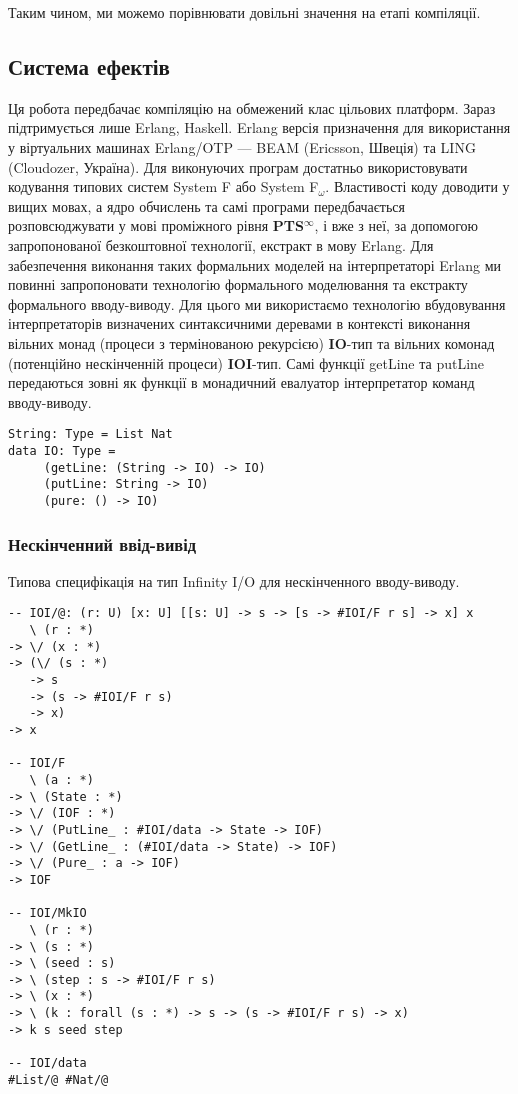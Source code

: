 \documentclass{article}
\begin{document}
Таким чином, ми можемо порівнювати довільні значення на етапі компіляції.

\subsection{Система ефектів}
Ця робота передбачає компіляцію на обмежений клас цільових платформ.
Зараз підтримується лише Erlang, Haskell. Erlang версія призначення для використання у віртуальних
машинах Erlang/OTP — BEAM (Ericsson, Швеція) та LING (Cloudozer, Україна).
Для виконуючих програм достатньо використовувати кодування типових систем System F або System F$_\omega$.
Властивості коду доводити у вищих мовах, а ядро обчислень та самі програми передбачається розповсюджувати
у мові проміжного рівня \textbf{PTS$^\infty$}, і вже з неї, за допомогою запропонованої безкоштовної
технології, екстракт в мову Erlang. Для забезпечення виконання таких формальних моделей на інтерпретаторі Erlang
ми повинні запропоновати технологію формального моделювання та екстракту формального вводу-виводу.
Для цього ми використаємо технологію вбудовування інтерпретаторів визначених синтаксичними деревами в контексті виконання
вільних монад (процеси з термінованою рекурсією) \textbf{IO}-тип та вільних комонад (потенційно нескінченній процеси) \textbf{IOI}-тип.
Самі функції getLine та putLine передаються зовні як функції в монадичний евалуатор інтерпретатор команд вводу-виводу.

\begin{lstlisting}
String: Type = List Nat
data IO: Type =
     (getLine: (String -> IO) -> IO)
     (putLine: String -> IO)
     (pure: () -> IO)
\end{lstlisting}

\subsubsection{Нескінченний ввід-вивід}

Типова специфікація на тип Infinity I/O для нескінченного вводу-виводу.

\begin{lstlisting}
-- IOI/@: (r: U) [x: U] [[s: U] -> s -> [s -> #IOI/F r s] -> x] x
   \ (r : *)
-> \/ (x : *)
-> (\/ (s : *)
   -> s
   -> (s -> #IOI/F r s)
   -> x)
-> x

-- IOI/F
   \ (a : *)
-> \ (State : *)
-> \/ (IOF : *)
-> \/ (PutLine_ : #IOI/data -> State -> IOF)
-> \/ (GetLine_ : (#IOI/data -> State) -> IOF)
-> \/ (Pure_ : a -> IOF)
-> IOF

-- IOI/MkIO
   \ (r : *)
-> \ (s : *)
-> \ (seed : s)
-> \ (step : s -> #IOI/F r s)
-> \ (x : *)
-> \ (k : forall (s : *) -> s -> (s -> #IOI/F r s) -> x)
-> k s seed step

-- IOI/data
#List/@ #Nat/@
\end{lstlisting}
\end{document}

